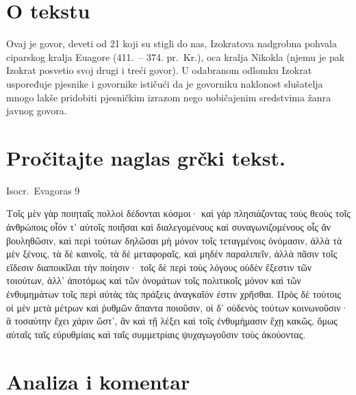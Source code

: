 

\section*{O tekstu}

Ovaj je govor, deveti od 21 koji su stigli do nas, Izokratova nadgrobna pohvala ciparskog kralja Euagore (411.\ – 374. pr.~Kr.), oca kralja Nikokla (njemu je pak Izokrat posvetio svoj drugi i treći govor). U odabranom odlomku Izokrat uspoređuje pjesnike i govornike ističući da je govorniku naklonost slušatelja mnogo lakše pridobiti pjesničkim izrazom nego uobičajenim sredstvima žanra javnog govora.


\section*{Pročitajte naglas grčki tekst.}


Isocr.\ Evagoras 9

\medskip

{\large
\begin{greek}
\noindent Τοῖς μὲν γὰρ ποιηταῖς πολλοὶ δέδονται κόσμοι· καὶ γὰρ πλησιάζοντας τοὺς θεοὺς τοῖς ἀνθρώποις οἷόν τ' αὐτοῖς ποιῆσαι καὶ διαλεγομένους καὶ συναγωνιζομένους οἷς ἂν βουληθῶσιν, καὶ περὶ τούτων δηλῶσαι μὴ μόνον τοῖς τεταγμένοις ὀνόμασιν, ἀλλὰ τὰ μὲν ξένοις, τὰ δὲ καινοῖς, τὰ δὲ μεταφοραῖς, καὶ μηδὲν παραλιπεῖν, ἀλλὰ πᾶσιν τοῖς εἴδεσιν διαποικῖλαι τὴν ποίησιν· τοῖς δὲ περὶ τοὺς λόγους οὐδὲν ἔξεστιν τῶν τοιούτων, ἀλλ' ἀποτόμως καὶ τῶν ὀνομάτων τοῖς πολιτικοῖς μόνον καὶ τῶν ἐνθυμημάτων τοῖς περὶ αὐτὰς τὰς πράξεις ἀναγκαῖόν ἐστιν χρῆσθαι. Πρὸς δὲ τούτοις οἱ μὲν μετὰ μέτρων καὶ ῥυθμῶν ἅπαντα ποιοῦσιν, οἱ δ' οὐδενὸς τούτων κοινωνοῦσιν· ἃ τοσαύτην ἔχει χάριν ὥστ', ἂν καὶ τῇ λέξει καὶ τοῖς ἐνθυμήμασιν ἔχῃ κακῶς, ὅμως αὐταῖς ταῖς εὐρυθμίαις καὶ ταῖς συμμετρίαις ψυχαγωγοῦσιν τοὺς ἀκούοντας.

\end{greek}

}

\section*{Analiza i komentar}

